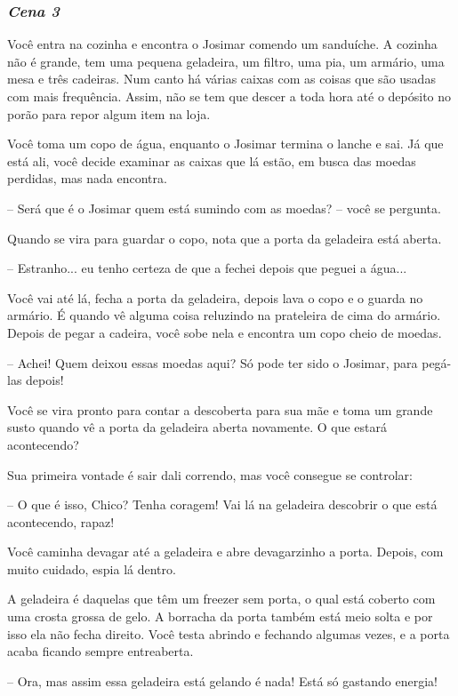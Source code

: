 \bigskip\medskip

\subsubsection*{\textit{\textbf{Cena 3}}}
Você entra na cozinha e encontra o Josimar comendo um sanduíche. A cozinha não é grande, tem uma pequena geladeira, um filtro, uma pia, um armário, uma mesa e três cadeiras. Num canto há várias caixas com as coisas que são usadas com mais frequência. Assim, não se tem que descer a toda hora até o depósito no porão para repor algum item na loja.

Você toma um copo de água, enquanto o Josimar termina o lanche e sai. Já que está ali, você decide examinar as caixas que lá estão, em busca das moedas perdidas, mas nada encontra.

-- Será que é o Josimar quem está sumindo com as moedas? -- você se pergunta.

Quando se vira para guardar o copo, nota que a porta da geladeira está aberta.

-- Estranho... eu tenho certeza de que a fechei depois que peguei a água...

Você vai até lá, fecha a porta da geladeira, depois lava o copo e o guarda no armário. É quando vê alguma coisa reluzindo na prateleira de cima do armário. Depois de pegar a cadeira, você sobe nela e encontra um copo cheio de moedas.

-- Achei! Quem deixou essas moedas aqui? Só pode ter sido o Josimar, para pegá-las depois!

Você se vira pronto para contar a descoberta para sua mãe e toma um grande susto quando vê a porta da geladeira aberta novamente. O que estará acontecendo?

Sua primeira vontade é sair dali correndo, mas você consegue se controlar:

-- O que é isso, Chico? Tenha coragem! Vai lá na geladeira descobrir o que está acontecendo, rapaz!

Você caminha devagar até a geladeira e abre devagarzinho a porta. Depois, com muito cuidado, espia lá dentro.

A geladeira é daquelas que têm um freezer sem porta, o qual está coberto com uma crosta grossa de gelo. A borracha da porta também está meio solta e por isso ela não fecha direito. Você testa abrindo e fechando algumas vezes, e a porta acaba ficando sempre entreaberta.

-- Ora, mas assim essa geladeira está gelando é nada! Está só gastando energia!


